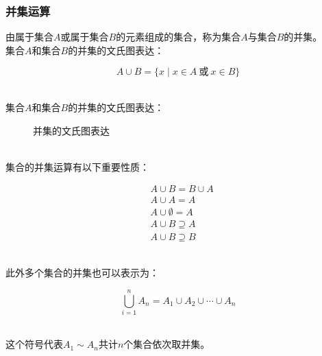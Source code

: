 \documentclass[UTF8]{ctexart}
\begin{document}
\newpage

\subsubsection{并集运算}
    由属于集合$A$或属于集合$B$的元素组成的集合，称为集合$A$与集合$B$的并集。\\[3mm]
    集合$A$和集合$B$的并集的文氏图表达：
    \begin{large}
        \begin{equation*}
            A\cup B=\big\{ x\mid x\in A~\text{或}~x\in B\big\}
        \end{equation*}
    \end{large}\\
    集合$A$和集合$B$的并集的文氏图表达：
    \begin{figure}[h]
        \begin{center}
            \caption{并集的文氏图表达}
        \end{center}
    \end{figure}\\
    集合的并集运算有以下重要性质：
    \begin{large}
        \begin{align*}
            &A\cup B=B\cup A\\[3mm]
            &A\cup A=A\\[3mm]
            &A\cup \emptyset=A\\[3mm]
            &A\cup B\supseteq A\\[3mm]
            &A\cup B\supseteq B
        \end{align*}
    \end{large}\\
    此外多个集合的并集也可以表示为：
    \begin{large}
        \begin{equation*}
            \bigcup_{i=1}^{n}A_n=A_1\cup A_2\cup\cdots\cup A_n
        \end{equation*}
    \end{large}\\
    这个符号代表$A_1\sim A_n$共计$n$个集合依次取并集。\\[12mm]
\end{document}
